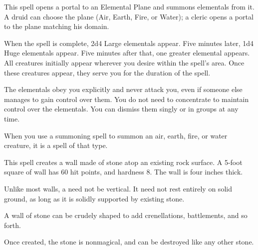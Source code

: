 \begin{spellheader}
\end{spellheader}
\begin{spellcontent}
    \spelleffect This spell opens a portal to an Elemental Plane and summons elementals from it. A druid can choose the plane (Air, Earth, Fire, or Water); a cleric opens a portal to the plane matching his domain.
    \par When the spell is complete, 2d4 Large elementals appear. Five minutes later, 1d4 Huge elementals appear. Five minutes after that, one greater elemental appears. All creatures initially appear wherever you desire within the spell's area. Once these creatures appear, they serve you for the duration of the spell.
    \par The elementals obey you explicitly and never attack you, even if someone else manages to gain control over them. You do not need to concentrate to maintain control over the elementals. You can dismiss them singly or in groups at any time.
    \spelldur{\durlong \dismissable}
\end{spellcontent}
\begin{spellfooter}
    \spellnotes When you use a summoning spell to summon an air, earth, fire, or water creature, it is a spell of that type.
\end{spellfooter}


\begin{spellheader}
    \begin{spelltargetinginfo}
    \end{spelltargetinginfo}
\end{spellheader}
\begin{spellcontent}
    \begin{spelleffects}
        \spelleffect This spell creates a wall made of stone atop an existing rock surface. A 5-foot square of wall has 60 hit points, and hardness 8. The wall is four inches thick.
        \par Unlike most walls, a  need not be vertical. It need not rest entirely on solid ground, as long as it is solidly supported by existing stone.
        \par A wall of stone can be crudely shaped to add crenellations, battlements, and so forth.
    \end{spelleffects}
\end{spellcontent}
\begin{spellfooter}
    \spellnotes Once created, the stone is nonmagical, and can be destroyed like any other stone.
\end{spellfooter}


